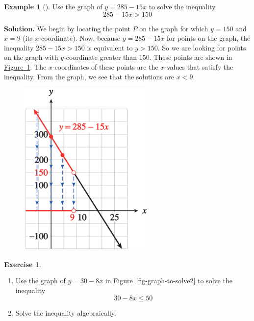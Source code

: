 \documentclass[10pt,]{book}
\theoremstyle{plain}
\theoremstyle{definition}
\newtheorem{exercise}[theorem]{Exercise}
\theoremstyle{definition}
\newtheorem{example}[theorem]{Example}
\numberwithin{equation}{section}
\newcommand{\lt}{ < }
\newcommand{\gt}{ > }
\begin{document}
\begin{example}[]\label{example-graph-to-solve2}
Use the graph of \(y = 285 − 15x\) to solve the inequality \begin{equation*}285 − 15x \gt 150\end{equation*}%
\par\medskip\noindent%
\textbf{Solution.}\quad 
    We begin by locating the point \(P\) on the graph for which \(y = 150\) and \(x = 9\) (its \(x\)-coordinate). Now, because \(y = 285 − 15x\) for points on the graph, the inequality \(285 − 15x \gt 150\) is equivalent to \(y \gt 150\). So we are looking for points on the graph with \(y\)-coordinate greater than \(150\). These points are shown in \hyperref[fig-graph-to-solve-inequality]{Figure~\ref{fig-graph-to-solve-inequality}}. The \(x\)-coordinates of these points are the \(x\)-values that satisfy the inequality. From the graph, we see that the solutions are \(x \lt 9\).
\leavevmode%
\begin{figure}
\centering
\includegraphics[width=0.60\textwidth,]{images/fig-graph-to-solve-inequality.svg}\caption{\label{fig-graph-to-solve-inequality}}
\end{figure}
\end{example}
\begin{exercise}\label{exercise-graph-to-solve-inequality}
\leavevmode%
\begin{enumerate}[label=*\alph**]
\item\hypertarget{li-140}{}Use the graph of \(y = 30 − 8x\) in  \hyperref[fig-graph-to-solve2]{Figure~\ref{fig-graph-to-solve2}} to solve the inequality \begin{equation*}30 − 8x \le 50\end{equation*}\item\hypertarget{li-141}{}Solve the inequality algebraically.\end{enumerate}
\end{exercise}
\end{document}
